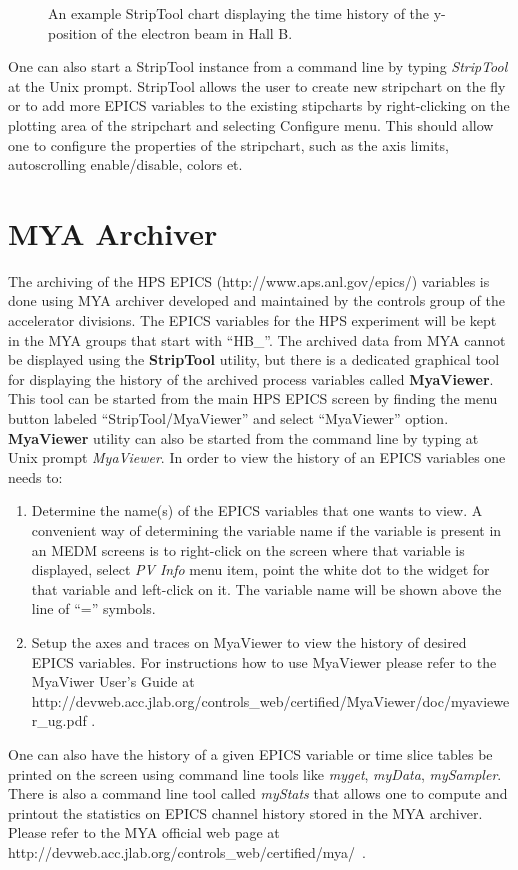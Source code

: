 \documentclass[letter,10pt]{article}
\begin{document}
 \begin{figure}
  \centering
  \caption{An example StripTool chart displaying the time history of the y-position of the electron beam in Hall B.} 
  \label{fig:strip_chart}
 \end{figure}

One can also start a StripTool instance from a command line by typing \textit{StripTool} at the Unix prompt. 
StripTool allows the user to create new stripchart on the fly or to add more EPICS 
variables to the existing stipcharts by right-clicking on the plotting area of the stripchart and selecting 
Configure menu. This should allow one to configure the properties of the stripchart, such as the axis limits, 
autoscrolling enable/disable, colors et.


\section{MYA Archiver}
The archiving of the HPS EPICS (http://www.aps.anl.gov/epics/) variables is done using MYA archiver
developed and maintained by the controls group of the accelerator divisions. The EPICS variables for 
the HPS experiment will be kept in the MYA groups that start with ``HB\_''. The archived data from MYA 
cannot be displayed using the \textbf{StripTool} utility, but there is a dedicated graphical tool for 
displaying the history of the archived process variables called \textbf{MyaViewer}. This tool can be started 
from the main HPS EPICS screen by finding the menu button labeled ``StripTool/MyaViewer'' and select ``MyaViewer'' option. 
\textbf{MyaViewer} utility can also be started from the command line by typing at Unix prompt \textit{MyaViewer}.
In order to view the history of an EPICS variables one needs to:
\begin{enumerate}
 \item Determine the name(s) of the EPICS variables that one wants to view. A convenient way of determining the variable name 
       if the variable is present in an MEDM screens is to right-click on the screen where that variable is displayed, 
       select \textit{PV Info} menu item, point the white dot to the widget for that variable and left-click on it. 
       The variable name will be shown above the line of ``='' symbols. 
 \item Setup the axes and traces on MyaViewer to view the history of desired EPICS variables. For instructions 
       how to use MyaViewer please refer to the MyaViwer User's
       Guide at \newline http://devweb.acc.jlab.org/controls\_web/certified/MyaViewer/doc/myaviewer\_ug.pdf .
\end{enumerate}
One can also have the history of a given EPICS variable or time slice tables be printed on the screen using  
command line tools like \textit{myget}, \textit{myData}, \textit{mySampler}. There is also a command
line tool called \textit{myStats} that allows one to
compute and printout the statistics on EPICS channel history stored in the MYA archiver. Please refer to the 
MYA official web page at \newline http://devweb.acc.jlab.org/controls\_web/certified/mya/~. 
\end{document}
